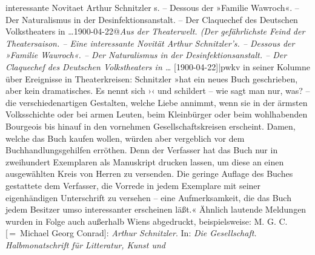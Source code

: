 \begin{ledgroupsized}[t]{13cm}
{{{{                  interessante Novitaet Arthur Schnitzler s. – Dessous der »Familie Wawroch«. – Der
                  Naturalismus in der Desinfektionsanstalt. – Der Claquechef des Deutschen
                  Volkstheaters in …1900-04-22@\emph{Aus der Theaterwelt. (Der gefährlichste Feind der Theatersaison. – Eine interessante Novität Arthur Schnitzler’s. – Dessous der »Familie Wawroch«. – Der Naturalismus in der Desinfektionsanstalt. – Der Claquechef des Deutschen Volkstheaters in …} {[}1900-04-22{]}|pwkv} in seiner Kolumne über Ereignisse in Theaterkreisen: Schnitzler »hat ein neues Buch
                     geschrieben, aber kein dramatisches. Es nennt sich ›‹ und schildert – wie sagt man nur, was? – die verschiedenartigen
                     Gestalten, welche Liebe annimmt, wenn sie in der ärmsten Volksschichte oder bei
                     armen Leuten, beim Kleinbürger oder beim wohlhabenden Bourgeois bis hinauf in
                     den vornehmen Gesellschaftskreisen erscheint. Damen, welche das Buch kaufen wollen, würden aber
                     vergeblich vor dem Buchhandlungsgehilfen erröthen. Denn der Verfasser hat das
                        Buch nur in
                     zweihundert Exemplaren als Manuskript drucken lassen, um diese an einen
                     ausgewählten Kreis von Herren zu versenden. Die geringe Auflage des Buches
                     gestattete dem Verfasser, die Vorrede in jedem Exemplare mit seiner
                     eigenhändigen Unterschrift zu versehen – eine Aufmerksamkeit, die das Buch
                     jedem Besitzer umso interessanter erscheinen läßt.« Ähnlich lautende
                  Meldungen wurden in Folge auch außerhalb Wiens
                  abgedruckt, beispielsweise: M. G. C. [ = Michael Georg Conrad]: \emph{Arthur Schnitzler}. In: \emph{Die Gesellschaft. Halbmonatschrift für Litteratur, Kunst und
}}}}
\end{ledgroupsized}
